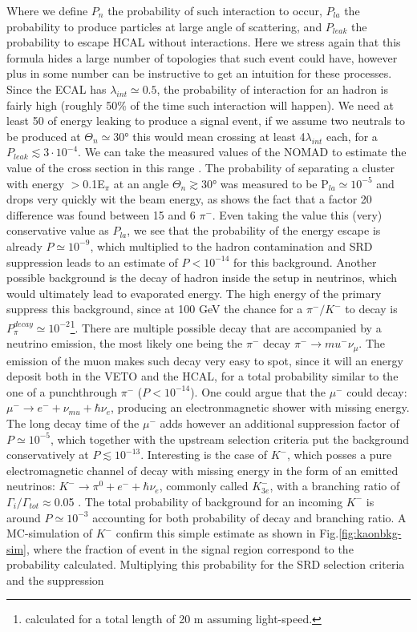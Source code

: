 Where we define $P_n$ the probability of such interaction to occur, $P_{la}$ the probability to produce particles at large angle of scattering, and $P_{leak}$ the probability to escape HCAL without interactions. Here we stress again that this formula hides a large number of topologies that such event could have, however plus in some number can be instructive to get an intuition for these processes. Since the ECAL has $\lambda_{int} \simeq 0.5$, the probability of interaction for an hadron is fairly high (roughly 50\% of the time such interaction will happen). We need at least 50 \gev of energy leaking to produce a signal event, if we assume two neutrals to be produced at $\Theta_{n} \simeq 30$\si{\degree} this would mean crossing at least 4$\lambda_{int}$ each, for a $P_{leak} \lesssim 3 \cdot 10^{-4}$. We can take the measured values of the NOMAD to estimate the value of the cross section in this range \cite{AUTIERO1998285,GNINENKO1998583}. The probability of separating a cluster with energy $>$0.1E$_{\pi}$ at an angle $\Theta_{n} \gtrsim 30$\si{\degree} was measured to be P$_{la} \simeq 10^{-5}$ and drops very quickly wit the beam energy, as shows the fact that a factor 20 difference was found between 15 \gev and 6 \gev $\pi^-$. Even taking the value this (very) conservative value as $P_{la}$, we see that the probability of the energy escape is already $P\simeq 10^{-9}$, which multiplied to the hadron contamination and SRD suppression leads to an estimate of $P<10^{-14}$ for this background. Another possible background is the decay of hadron inside the setup in neutrinos, which would ultimately lead to evaporated energy. The high energy of the primary suppress this background, since at 100 GeV the chance for a $\pi^-/K^-$ to decay is $P^{decay}_{\pi} \simeq  10^{-2}$\footnote{calculated for a total length of 20 m assuming light-speed.}. There are multiple possible decay that are accompanied by a neutrino emission, the most likely one being the $\pi^-$ decay $\pi^- \rightarrow mu^- \nu_{\mu}$. The emission of the muon makes such decay very easy to spot, since it will an energy deposit both in the VETO and the HCAL, for a total probability similar to the one of a punchthrough $\pi^-$ ($P < 10^{-14}$). One could argue that the $\mu^-$ could decay: $\mu^- \rightarrow e^- + \nu_{mu}+ \hbar{\nu_{e}}$, producing an electronmagnetic shower with missing energy. The long decay time of the $\mu^-$ adds however an additional suppression factor of $P\simeq 10^{-5}$, which together with the upstream selection criteria put the background conservatively at $P \lesssim 10^{-13}$. Interesting is the case of $K^-$, which posses a pure electromagnetic channel of decay with missing energy in the form of an emitted neutrinos: $K^- \rightarrow \pi^0 + e^- + \hbar{\nu_e}$, commonly called $K^-_{3e}$, with a branching ratio of $\Gamma_i/\Gamma_{tot} \approx$0.05 \cite{particle-strange-mesons}. The total probability of background for an incoming $K^-$ is around $P\simeq 10^{-3}$ accounting for both probability of decay and branching ratio. A MC-simulation of $K^-$ confirm this simple estimate as shown in Fig.\ref{fig:kaonbkg-sim}, where the fraction of event in the signal region correspond to the probability calculated. Multiplying this probability for the SRD selection criteria and the suppression 